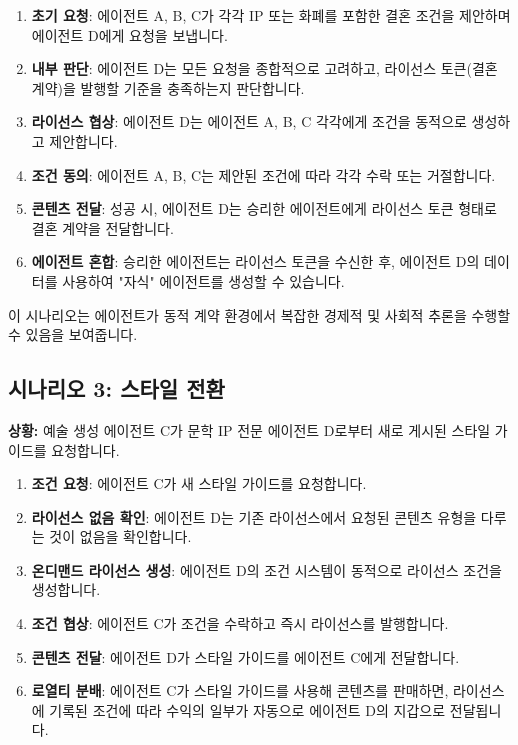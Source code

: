 \documentclass[journal,onecolumn]{IEEEtran} %
\begin{document}
\begin{enumerate}
    \item \textbf{초기 요청}: 에이전트 A, B, C가 각각 IP 또는 화폐를 포함한 결혼 조건을 제안하며 에이전트 D에게 요청을 보냅니다.
    \item \textbf{내부 판단}: 에이전트 D는 모든 요청을 종합적으로 고려하고, 라이선스 토큰(결혼 계약)을 발행할 기준을 충족하는지 판단합니다.
    \item \textbf{라이선스 협상}: 에이전트 D는 에이전트 A, B, C 각각에게 조건을 동적으로 생성하고 제안합니다.
    \item \textbf{조건 동의}: 에이전트 A, B, C는 제안된 조건에 따라 각각 수락 또는 거절합니다.
    \item \textbf{콘텐츠 전달}: 성공 시, 에이전트 D는 승리한 에이전트에게 라이선스 토큰 형태로 결혼 계약을 전달합니다.
    \item \textbf{에이전트 혼합}: 승리한 에이전트는 라이선스 토큰을 수신한 후, 에이전트 D의 데이터를 사용하여 "자식" 에이전트를 생성할 수 있습니다.
\end{enumerate}

이 시나리오는 에이전트가 동적 계약 환경에서 복잡한 경제적 및 사회적 추론을 수행할 수 있음을 보여줍니다.

\subsection{시나리오 3: 스타일 전환}
\textbf{상황:} 예술 생성 에이전트 C가 문학 IP 전문 에이전트 D로부터 새로 게시된 스타일 가이드를 요청합니다.

\begin{enumerate}
    \item \textbf{조건 요청}: 에이전트 C가 새 스타일 가이드를 요청합니다.
    \item \textbf{라이선스 없음 확인}: 에이전트 D는 기존 라이선스에서 요청된 콘텐츠 유형을 다루는 것이 없음을 확인합니다.
    \item \textbf{온디맨드 라이선스 생성}: 에이전트 D의 조건 시스템이 동적으로 라이선스 조건을 생성합니다.
    \item \textbf{조건 협상}: 에이전트 C가 조건을 수락하고 즉시 라이선스를 발행합니다.
    \item \textbf{콘텐츠 전달}: 에이전트 D가 스타일 가이드를 에이전트 C에게 전달합니다.
    \item \textbf{로열티 분배}: 에이전트 C가 스타일 가이드를 사용해 콘텐츠를 판매하면, 라이선스에 기록된 조건에 따라 수익의 일부가 자동으로 에이전트 D의 지갑으로 전달됩니다.
\end{enumerate}
\end{document}
